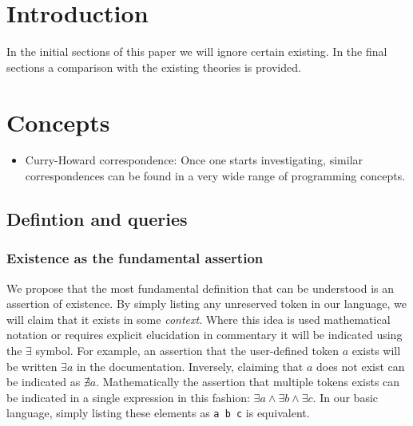 \documentclass[11pt]{article}
\begin{document}
\section{Introduction}
In the initial sections of this paper we will ignore certain existing. In the final sections a comparison with the existing theories is provided.

\section{Concepts}

\begin{itemize}
\item Curry-Howard correspondence: Once one starts investigating, similar correspondences can be found in a very wide range of programming concepts.
\end{itemize}

\subsection{Defintion and queries}
\subsubsection{Existence as the fundamental assertion}
We propose that the most fundamental definition that can be understood is an assertion of existence. 
By simply listing any unreserved token in our language, we will claim that it exists in some \emph{context}.
Where this idea is used mathematical notation or requires explicit elucidation in commentary it will be indicated using the $\exists$ symbol.
For example, an assertion that the user-defined token $a$ exists will be written $\exists a$ in the documentation.
Inversely, claiming that $a$ does not exist can be indicated as $\nexists a$.
Mathematically the assertion that multiple tokens exists can be indicated in a single expression in this fashion: $\exists a \land \exists b \land \exists c$.
In our basic language, simply listing these elements as \texttt{a b c} is equivalent.

\end{document}
